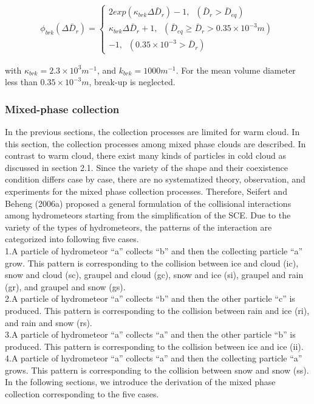 \begin{eqnarray}
\phi_{brk}(\Delta\bar{D}_{r})=
\left\{
\begin{array}{l}
2exp(\kappa_{brk}\Delta\bar{D}_{r})-1,\;\;(\bar{D}_{r}>\bar{D}_{eq}) \\
\kappa_{brk}\Delta\bar{D}_{r}+1,\;\;(\bar{D}_{eq}\geq \bar{D}_{r}>0.35\times 10^{-3}m) \\
-1,\;\;(0.35\times10^{-3}>\bar{D}_{r}) 
\label{sn155}
\end{array}
\right.
\end{eqnarray}

with $\kappa_{brk} = 2.3 \times 10^{3} m^{-1}$, and $k_{brk} = 1000 m^{-1}$. For the mean volume diameter less than $0.35 \times 10^{-3}m$, break-up is neglected.

\subsubsection{Mixed-phase collection}
In the previous sections, the collection processes are limited for warm cloud. In this section, the collection processes among mixed phase clouds are described. In contrast to warm cloud, there exist many kinds of particles in cold cloud as discussed in section 2.1. Since the variety of the shape and their coexistence condition differs case by case, there are no systematized theory, observation, and experiments for the mixed phase collection processes. Therefore, Seifert and Beheng (2006a) proposed a general formulation of the collisional interactions among hydrometeors starting from the simplification of the SCE. Due to the variety of the types of hydrometeors, the patterns of the interaction are categorized into following five cases.\\
1.A particle of hydrometeor “a” collects “b” and then the collecting particle “a” grow. This pattern is corresponding to the collision between ice and cloud (ic), snow and cloud (sc), graupel and cloud (gc), snow and ice (si), graupel and rain (gr), and graupel and snow (gs).\\
2.A particle of hydrometeor “a” collects “b” and then the other particle “c” is produced. This pattern is corresponding to the collision between rain and ice (ri), and rain and snow (rs).\\
3.A particle of hydrometeor “a” collects “a” and then the other particle “b” is produced. This pattern is corresponding to the collision between ice and ice (ii).\\
4.A particle of hydrometeor “a” collects “a” and then the collecting particle “a” grows. This pattern is corresponding to the collision between snow and snow (ss).\\
In the following sections, we introduce the derivation of the mixed phase collection corresponding to the five cases.


